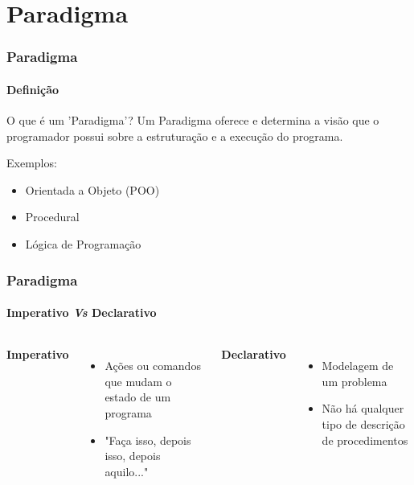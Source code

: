 \documentclass[aspectratio=169]{beamer}
\begin{document}
    \nocite{haskellmicrosoft}
    \nocite{haskellreport2010}
    \nocite{haskelljobs}
    \nocite{haskellers}

    \section{Paradigma}

    \begin{frame}

      \frametitle{Paradigma}
      \framesubtitle{Definição}

      \begin{block}{O que é um 'Paradigma'?}
        Um Paradigma oferece e determina a visão que o programador possui sobre a estruturação
        e a execução do programa.
       \end{block} \pause 

       Exemplos:

       \begin{itemize}
         \item Orientada a Objeto (POO)
         \item Procedural
         \item Lógica de Programação
       \end{itemize}

    \end{frame}

    \begin{frame}
      \frametitle{Paradigma}
      \framesubtitle{Imperativo \emph{Vs} Declarativo}

      \pause

      \begin{columns}
        \textbf{Imperativo} 

        \begin{itemize}
          \item Ações ou comandos que mudam o estado de um programa 
          \item "Faça isso, depois isso, depois aquilo..." \pause
        \end{itemize}


        \textbf{Declarativo} 
        \begin{itemize}
          \item Modelagem de um problema 
          \item Não há qualquer tipo de descrição de procedimentos
        \end{itemize}

      \end{columns}
    \end{frame}
\end{document}

